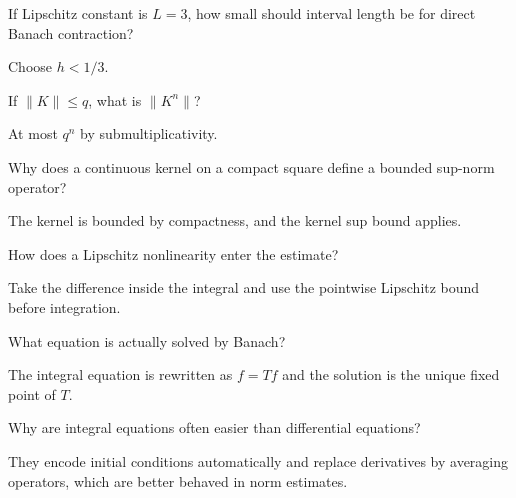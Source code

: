 \begin{problem}\label{prob:ii18-problem-07}
If Lipschitz constant is $L=3$, how small should interval length be for direct Banach contraction?
\end{problem}
\begin{solution}
Choose $h<1/3$.
\end{solution}

\begin{problem}\label{prob:ii18-problem-08}
If $\|K\|\le q$, what is $\|K^n\|$?
\end{problem}
\begin{solution}
At most $q^n$ by submultiplicativity.
\end{solution}

\begin{problem}\label{prob:ii18-problem-09}
Why does a continuous kernel on a compact square define a bounded sup-norm operator?
\end{problem}
\begin{solution}
The kernel is bounded by compactness, and the kernel sup bound applies.
\end{solution}

\begin{problem}\label{prob:ii18-problem-10}
How does a Lipschitz nonlinearity enter the estimate?
\end{problem}
\begin{solution}
Take the difference inside the integral and use the pointwise Lipschitz bound before integration.
\end{solution}

\begin{problem}\label{prob:ii18-problem-11}
What equation is actually solved by Banach?
\end{problem}
\begin{solution}
The integral equation is rewritten as $f=Tf$ and the solution is the unique fixed point of $T$.
\end{solution}

\begin{problem}\label{prob:ii18-problem-12}
Why are integral equations often easier than differential equations?
\end{problem}
\begin{solution}
They encode initial conditions automatically and replace derivatives by averaging operators, which are better behaved in norm estimates.
\end{solution}

